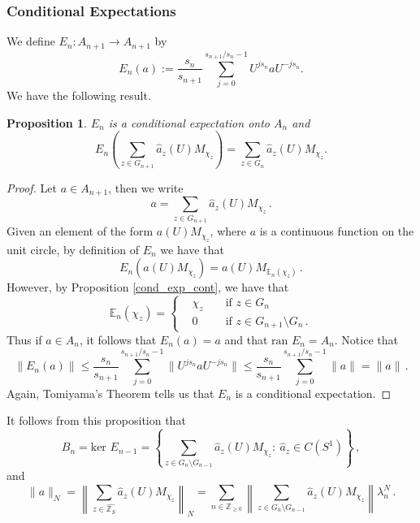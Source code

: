 \documentclass[12pt,reqno]{amsart}
\numberwithin{equation}{section}
\newcommand{\E}{{\mathbb E}}
\newcommand{\Z}{{\mathbb Z}}
\newtheorem{prop}[theo]{{\sc \bf Proposition}}
\begin{document}
\subsubsection{Conditional Expectations}
We define $E_n:A_{n+1}\to A_{n+1}$ by
\begin{equation*}
E_n(a):=\frac{s_n}{s_{n+1}}\sum_{j=0}^{s_{n+1}/s_n-1}U^{js_n}aU^{-js_n}.
\end{equation*}
We have the following result.
\begin{prop} $E_n$ is a conditional expectation onto $A_n$ and
\begin{equation*}
E_n\left(\sum_{z\in G_{n+1}}\hat{a}_z(U) M_{\chi_z}\right)=\sum_{z\in G_{n}}\hat{a}_z(U) M_{\chi_z}.
\end{equation*}
\end{prop}
\begin{proof}
Let $a\in A_{n+1}$, then we write
\begin{equation*}
a=\sum_{z\in G_{n+1}}\hat{a}_z(U)M_{\chi_z}\,.
\end{equation*}
Given an element of the form $a(U)M_{\chi_z}$, where $a$ is a continuous function on the unit circle, by definition of $E_n$ we have that
\begin{equation*}
E_n\left(a(U)M_{\chi_z}\right) = a(U)M_{\E_n(\chi_z)}\,.
\end{equation*}
However, by Proposition \ref{cond_exp_cont}, we have that
\begin{equation*}
\E_n(\chi_z)=\left\{
\begin{aligned}
&\chi_z &&\textrm{ if }z\in G_n \\
&0 &&\textrm{ if }z\in G_{n+1}\setminus G_n\,.
\end{aligned}\right.
\end{equation*}
Thus if $a\in A_n$, it follows that $E_n(a)=a$ and that $\textrm{ran }E_n=A_n$. Notice that
\begin{equation*}
\|E_n(a)\|\le \frac{s_n}{s_{n+1}}\sum_{j=0}^{s_{n+1}/s_n-1}\|U^{js_n}aU^{-js_n}\|\le \frac{s_n}{s_{n+1}}\sum_{j=0}^{s_{n+1}/s_n-1}\|a\| = \|a\|\,.
\end{equation*}
Again, Tomiyama's Theorem tells us that $E_n$ is a conditional expectation.
\end{proof}
It follows from this proposition that
\begin{equation*}
B_n = \textrm{ker }E_{n-1} = \left\{\sum_{z\in G_n\setminus G_{n-1}} \hat{a}_z(U) M_{\chi_z}:\  \hat{a}_z\in C(S^1)\right\}\,,
\end{equation*}
and
\begin{equation*}
\|a\|_N = \left\|\sum_{z\in \widehat{\Z_S}} \hat{a}_z(U) M_{\chi_z}\right\|_N = \sum_{n\in\Z_{\ge0}}\left\|\sum_{z\in G_n\setminus G_{n-1}} \hat{a}_z(U)M_{\chi_z}\right\|\lambda_n^N\,.
\end{equation*}
\end{document}
